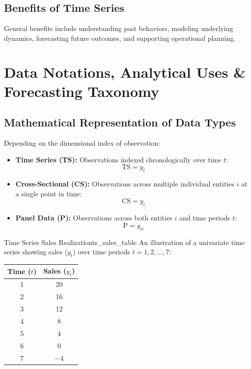 \subsection{Benefits of Time Series}
General benefits include understanding past behaviors, modeling underlying dynamics, forecasting future outcomes, and supporting operational planning.

\section{Data Notations, Analytical Uses \& Forecasting Taxonomy}

\subsection{Mathematical Representation of Data Types}
Depending on the dimensional index of observation:
\begin{itemize}[leftmargin=*]
    \item \textbf{Time Series (TS):} Observations indexed chronologically over time $t$:
    \begin{equation}
        \text{TS} = y_t
    \end{equation}
    \item \textbf{Cross-Sectional (CS):} Observations across multiple individual entities $i$ at a single point in time:
    \begin{equation}
        \text{CS} = y_i
    \end{equation}
    \item \textbf{Panel Data (P):} Observations across both entities $i$ and time periods $t$:
    \begin{equation}
        \text{P} = y_{it}
    \end{equation}
\end{itemize}

\begin{example}{Time Series Sales Realization}{ts_sales_table}
An illustration of a univariate time series showing sales ($y_t$) over time periods $t = 1, 2, \dots, 7$:
\begin{center}
\small
\begin{tabular}{|c|c|}
\hline
\textbf{Time ($t$)} & \textbf{Sales ($y_t$)} \\
\hline
1 & 20 \\
2 & 16 \\
3 & 12 \\
4 & 8  \\
5 & 4  \\
6 & 0  \\
7 & $-4$ \\
\hline
\end{tabular}
\end{center}
\end{example}

